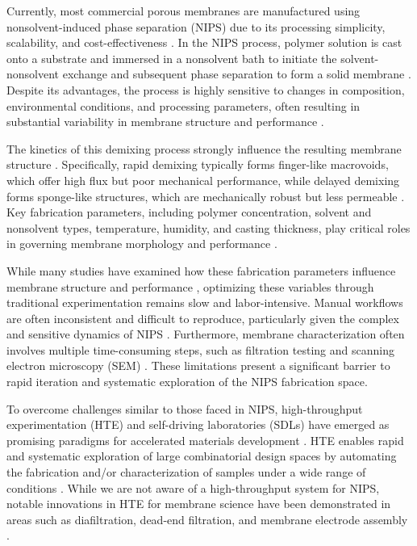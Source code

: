\documentclass[preprint,12pt,times]{elsarticle}
\begin{document}
Currently, most commercial porous membranes are manufactured using nonsolvent-induced phase separation (NIPS) due to its processing simplicity, scalability, and cost-effectiveness \cite{Tan2019, LIU20111}. In the NIPS process, polymer solution is cast onto a substrate and immersed in a nonsolvent bath to initiate the solvent-nonsolvent exchange and subsequent phase separation to form a solid membrane \cite{LIU20111, Mulder1996}. Despite its advantages, the process is highly sensitive to changes in composition, environmental conditions, and processing parameters, often resulting in substantial variability in membrane structure and performance \cite{Guillen2011, Jung2016, Zheng2006}. 

The kinetics of this demixing process strongly influence the resulting membrane structure \cite{Guillen2011}. Specifically, rapid demixing typically forms finger-like macrovoids, which offer high flux but poor mechanical performance, while delayed demixing forms sponge-like structures, which are mechanically robust but less permeable \cite{Guillen2011}. Key fabrication parameters, including polymer concentration, solvent and nonsolvent types, temperature, humidity, and casting thickness, play critical roles in governing membrane morphology and performance \cite{Guillen2011, MOSQUEDAJIMENEZ2004209, STRATHMANN1975179}.

While many studies have examined how these fabrication parameters influence membrane structure and performance \cite{Jung2016, Zheng2006, Zheng20062, Dong2021,ALEXANDRE20001}, optimizing these variables through traditional experimentation remains slow and labor-intensive. Manual workflows are often inconsistent and difficult to reproduce, particularly given the complex and sensitive dynamics of NIPS \cite{Guillen2011, Garcia2020}. Furthermore, membrane characterization often involves multiple time-consuming steps, such as filtration testing and scanning electron microscopy (SEM) \cite{Hobaib2015, Abdullah2014}. These limitations present a significant barrier to rapid iteration and systematic exploration of the NIPS fabrication space.

To overcome challenges similar to those faced in NIPS, high-throughput experimentation (HTE) and self-driving laboratories (SDLs) have emerged as promising paradigms for accelerated materials development \cite{Potyrailo2011, STACH20212702}. HTE enables rapid and systematic exploration of large combinatorial design spaces by automating the fabrication and/or characterization of samples under a wide range of conditions \cite{Potyrailo2011}. While we are not aware of a high-throughput system for NIPS, notable innovations in HTE for membrane science have been demonstrated in areas such as diafiltration, dead-end filtration, and membrane electrode assembly \cite{OUIMET2022119743, VANDEZANDE2005305, D2CY00873D}. 
\end{document}

